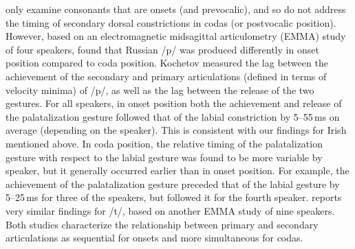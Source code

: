 \documentclass[output=paper,colorlinks,citecolor=brown]{langscibook}
\newcommand{\pal}{\ipa{ʲ}}
\begin{document}
\citet{Bennett_etal2018_Conamara_ultrasound} only examine consonants that are onsets (and prevocalic), and so do not address the timing of secondary dorsal constrictions in codas (or postvocalic position). However, based on an electromagnetic midsagittal articulometry (EMMA) study of four speakers, \citet{Kochetov2006_syll_poss} found that Russian /p\pal/ was produced differently in onset position compared to coda position. Kochetov measured the lag between the achievement of the secondary and primary articulations (defined in terms of velocity minima) of /p\pal/, as well as the lag between the release of the two gestures. For all speakers, in onset position both the achievement and release of the palatalization gesture followed that of the labial constriction by 5--55\,ms on average (depending on the speaker). This is consistent with our findings for Irish mentioned above. In coda position, the relative timing of the palatalization gesture with respect to the labial gesture was found to be more variable by speaker, but it generally occurred earlier than in onset position. For example, the achievement of the palatalization gesture preceded that of the labial gesture by 5--25\,ms for three of the speakers, but followed it for the fourth speaker. \citet[][159--160]{Biteeva2021_Russian_palatals_PhD} reports very similar findings for /t\pal/, based on another EMMA study of nine speakers. Both studies characterize the relationship between primary and secondary articulations as sequential for onsets and more simultaneous for codas.
\end{document}
